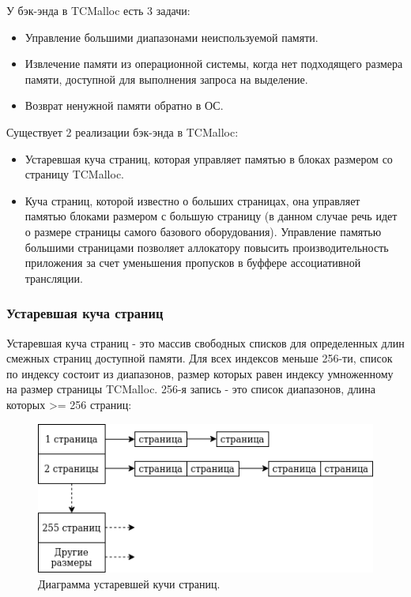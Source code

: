 У бэк-энда в TCMalloc есть 3 задачи:
\begin{itemize}
	\item Управление большими диапазонами неиспользуемой памяти.
	\item Извлечение памяти из операционной системы, когда нет подходящего размера памяти, доступной для выполнения запроса на выделение.
	\item Возврат ненужной памяти обратно в ОС.
\end{itemize}

Существует 2 реализации бэк-энда в TCMalloc:
\begin{itemize}
	\item Устаревшая куча страниц, которая управляет памятью в блоках размером со страницу TCMalloc.
	\item Куча страниц, которой известно о больших страницах, она управляет памятью блоками размером с большую страницу (в данном случае речь идет о размере страницы самого базового оборудования). Управление памятью большими страницами позволяет аллокатору повысить производительность приложения за счет уменьшения пропусков в буффере ассоциативной трансляции.
\end{itemize}

\subsubsection{Устаревшая куча страниц}

Устаревшая куча страниц - это массив свободных списков для определенных длин смежных страниц доступной памяти. Для всех индексов меньше 256-ти, список по индексу состоит из диапазонов, размер которых равен индексу умноженному на размер страницы TCMalloc. 256-я запись - это список диапазонов, длина которых >= 256 страниц:

\begin{figure}[!h]
	\begin{center}
		\includegraphics[scale=0.6]{images/tcmalloc-legacy-pageheap.png}
		\caption{Диаграмма устаревшей кучи страниц.}
		\label{tcmalloc-legacy-pageheap}
	\end{center}
\end{figure}

